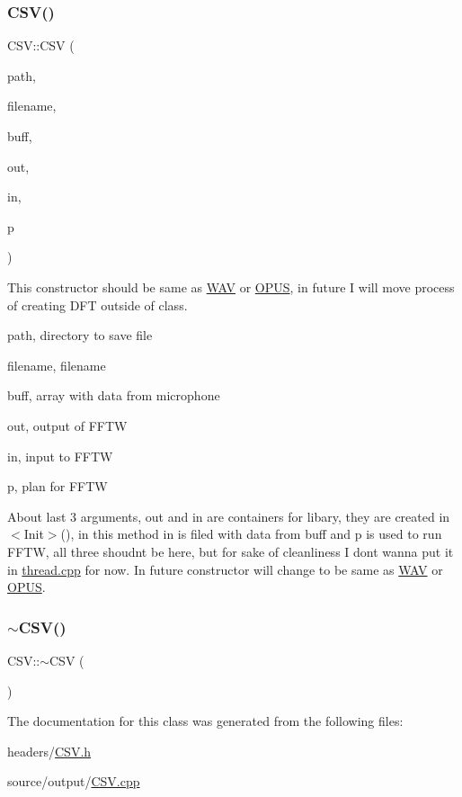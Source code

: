 \subsubsection{\texorpdfstring{C\+S\+V()}{CSV()}}
{\footnotesize\ttfamily C\+S\+V\+::\+C\+SV (\begin{DoxyParamCaption}\item[{string}]{path,  }\item[{string}]{filename,  }\item[{float $\ast$}]{buff,  }\item[{fftw\+\_\+complex $\ast$}]{out,  }\item[{double $\ast$}]{in,  }\item[{fftw\+\_\+plan}]{p }\end{DoxyParamCaption})}



This constructor should be same as \hyperlink{class_w_a_v}{W\+AV} or \hyperlink{class_o_p_u_s}{O\+P\+US}, in future I will move process of creating D\+FT outside of class. 


\begin{DoxyItemize}
\item path, directory to save file
\item filename, filename
\item buff, array with data from microphone
\item out, output of F\+F\+TW
\item in, input to F\+F\+TW
\item p, plan for F\+F\+TW
\end{DoxyItemize}

About last 3 arguments, out and in are containers for libary, they are created in $<$\+Init$>$(), in this method in is filed with data from buff and p is used to run F\+F\+TW, all three shoudn\textquotesingle{}t be here, but for sake of cleanliness I dont\textquotesingle{} wanna put it in \hyperlink{thread_8cpp}{thread.\+cpp} for now. In future constructor will change to be same as \hyperlink{class_w_a_v}{W\+AV} or \hyperlink{class_o_p_u_s}{O\+P\+US}. \mbox{\label{class_c_s_v_ae1b0cfd98d62cf81004462320848c665}} 
\subsubsection{\texorpdfstring{$\sim$\+C\+S\+V()}{~CSV()}}
{\footnotesize\ttfamily C\+S\+V\+::$\sim$\+C\+SV (\begin{DoxyParamCaption}{ }\end{DoxyParamCaption})}



The documentation for this class was generated from the following files\+:\begin{DoxyCompactItemize}
\item 
headers/\hyperlink{_c_s_v_8h}{C\+S\+V.\+h}\item 
source/output/\hyperlink{_c_s_v_8cpp}{C\+S\+V.\+cpp}\end{DoxyCompactItemize}
